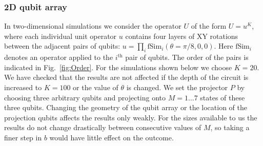 \documentclass[%
 reprint,
 superscriptaddress,
 amsmath,amssymb,
prx,
]{revtex4-2}\href{\href{}{}}{}
\begin{document}
\subsubsection{2D qubit array}

In two-dimensional simulations we consider the operator $U$ of the form $U=u^K$, where each individual unit operator $u$ contains four layers of XY rotations between the adjacent pairs of qubits: $u=\prod_i\text{fSim}_i(\theta=\pi/8,0,0)$. Here $\text{fSim}_i$  denotes an operator applied to the $i^\text{th}$ pair of qubits. The order of the pairs is indicated in Fig.~\ref{fig:Order}. For the simulations shown below we choose $K=20$. We have checked that the results are not affected if the depth of the circuit is increased to $K=100$ or the value of $\theta$ is changed. We set the projector $P$ by choosing three arbitrary qubits and projecting onto $M=1\ldots 7$ states of these three qubits. Changing the geometry of the qubit array or the location of the projection qubits affects the results only weakly. For the sizes available to us the results do not change drastically between consecutive values of $M$, so taking a finer step in $b$ would have little effect on the outcome. 
\end{document}
